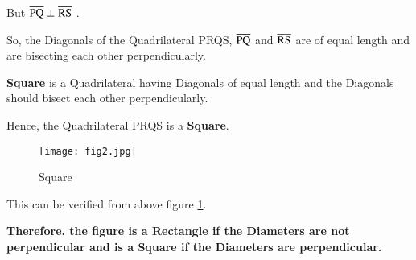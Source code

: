 \documentclass[journal,12pt,twocolumn]{IEEEtran}
\begin{document}
But $\overline{\rm PQ} \perp \overline{\rm RS}$ .

So, the Diagonals of the Quadrilateral PRQS, $\overline{\rm PQ}$ and $\overline{\rm RS}$ are of equal length and are bisecting each other perpendicularly.

\textbf{Square} is a Quadrilateral having Diagonals of equal length and the Diagonals should bisect each other perpendicularly.

Hence, the Quadrilateral PRQS is a \textbf{Square}.

\begin{figure}[!h]
\centering
\texttt{[image: fig2.jpg]}
\caption{Square}
\label{square}
\end{figure}

This can be verified from above figure \ref{square}.

\textbf{Therefore, the figure is a Rectangle if the Diameters are not perpendicular and is a Square if the Diameters are perpendicular.}
\end{document}
